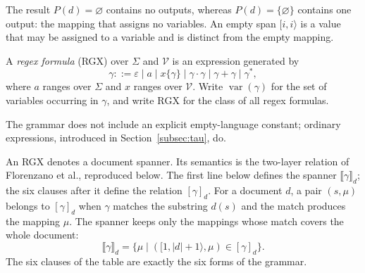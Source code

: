 The result $P(d)=\varnothing$ contains no outputs, whereas
$P(d)=\{\varnothing\}$ contains one output: the mapping that assigns
no variables. An empty span $[i,i\rangle$ is a value that may be assigned
to a variable and is distinct from the empty mapping.

\begin{definition}\label{def:rgx}
A \emph{regex formula} (RGX) over $\Sigma$ and $\mathcal V$ is an
expression generated by
\[
  \gamma ::= \varepsilon \mid a \mid x\{\gamma\} \mid \gamma\cdot\gamma
             \mid \gamma + \gamma \mid \gamma^{*},
\]
where $a$ ranges over $\Sigma$ and $x$ ranges over $\mathcal V$.
Write $\operatorname{var}(\gamma)$ for the set of variables occurring
in $\gamma$, and write $\mathrm{RGX}$ for the class of all regex formulas.
\end{definition}

The grammar does not include an explicit empty-language constant;
ordinary expressions, introduced in Section~\ref{subsec:tau}, do.

An RGX denotes a document spanner. Its semantics is the two-layer
relation of Florenzano et al., reproduced below. The first line below
defines the spanner $\llbracket\gamma\rrbracket_d$; the six clauses
after it define the relation $[\gamma]_d$. For a document $d$, a pair
$(s,\mu)$ belongs to $[\gamma]_d$ when $\gamma$ matches the substring
$d(s)$ and the match produces the mapping $\mu$. The spanner keeps only
the mappings whose match covers the whole document:
\[
  \llbracket\gamma\rrbracket_d
  =\{\mu\mid ([1,|d|+1\rangle,\mu)\in[\gamma]_d\}.
\]
The six clauses of the table are exactly the six forms of the grammar.

